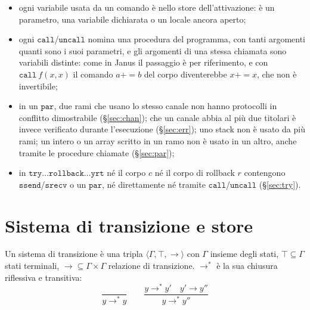 \begin{itemize}
    $\mathtt{nil}$ per uno stack, $\mathtt{empty}$ per un canale;
  \item ogni variabile usata da un comando è nello store dell'attivazione: è un
    parametro, una variabile dichiarata o un locale ancora aperto;
  \item ogni $\mathtt{call}$/$\mathtt{uncall}$ nomina una procedura del
    programma, con tanti argomenti quanti sono i suoi parametri, e gli argomenti
    di una stessa chiamata sono variabili distinte: come in Janus il passaggio è
    per riferimento, e con $\mathtt{call}\ f(x, x)$ il comando $a \mathbin{+\!\!=} b$
    del corpo diventerebbe $x \mathbin{+\!\!=} x$, che non è invertibile;
  \item in un $\mathtt{par}$, due rami che usano lo stesso canale non hanno
    protocolli in conflitto dimostrabile (\S\ref{sec:chan}); che un canale
    abbia al più due titolari è invece verificato durante l'esecuzione
    (\S\ref{sec:err}); uno stack non è usato da più rami; un intero o un
    array scritto in un ramo non è usato in un altro, anche tramite le
    procedure chiamate (\S\ref{sec:par});
  \item in $\mathtt{try}\ldots\mathtt{rollback}\ldots\mathtt{yrt}$ né il corpo
    $c$ né il corpo di rollback $r$ contengono $\mathtt{ssend}$/$\mathtt{srecv}$
    o un $\mathtt{par}$, né direttamente né tramite
    $\mathtt{call}$/$\mathtt{uncall}$ (\S\ref{sec:try}).
\end{itemize}

\section{Sistema di transizione e store}
\label{sec:store}

Un sistema di transizione è una tripla $\langle \Gamma, \top, \to \rangle$ con
$\Gamma$ insieme degli stati, $\top \subseteq \Gamma$ stati terminali,
${\to} \subseteq \Gamma \times \Gamma$ relazione di transizione. $\to^*$ è la
sua chiusura riflessiva e transitiva:
\[
\dfrac{}{y \to^* y}
\qquad
\dfrac{y \to^* y' \quad y' \to y''}{y \to^* y''}
\]

